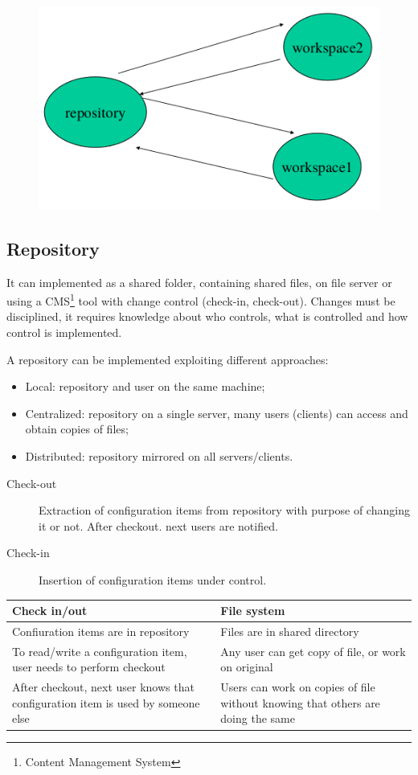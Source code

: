 \begin{figure}[hbtp]
\centering
\includegraphics[scale=0.3]{images/repository_workspace.png}
\end{figure}

\subsection{Repository}
It can implemented as a shared folder, containing shared files, on file server or using a CMS\footnote{Content Management System} tool with change control (check-in, check-out). Changes must be disciplined, it requires knowledge about who controls, what is controlled and how control is implemented.

A repository can be implemented exploiting different approaches:
\begin{itemize}
\item Local: repository and user on the same machine;
\item Centralized: repository on a single server, many users (clients) can access and obtain copies of files;
\item Distributed: repository mirrored on all servers/clients.
\end{itemize}

\begin{description}
\item [Check-out] Extraction of configuration items from repository with purpose of changing it or not. After checkout. next users are notified.
\item [Check-in] Insertion of configuration items under control.
\end{description}

\begin{center}
\begin{tabularx}{\textwidth}{X|X}
Check in/out & File system \\ 
\hline 
Confiuration items are in repository & Files are in shared directory \\ 
\hline 
To read/write a configuration item, user needs to perform checkout & Any user can get copy of file, or work on original \\
\hline 
After checkout, next user knows that configuration item is used by someone else & Users can work on copies of file without knowing that others are doing the same
\end{tabularx} 
\end{center}

